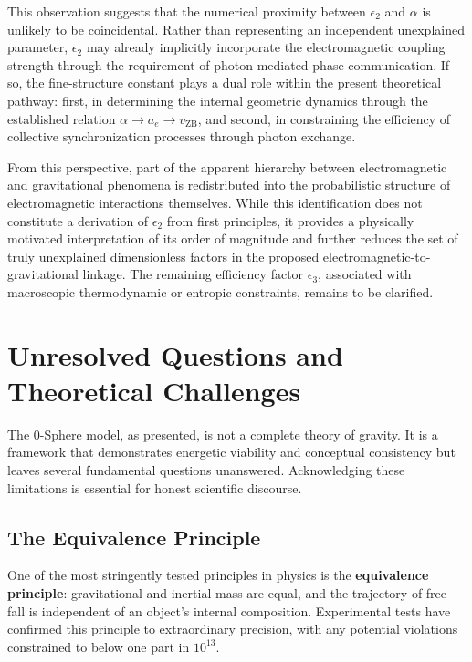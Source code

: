 \documentclass[12pt,letterpaper]{article}
\begin{document}
This observation suggests that the numerical proximity between $\epsilon_2$ and $\alpha$ is unlikely to be coincidental. Rather than representing an independent unexplained parameter, $\epsilon_2$ may already implicitly incorporate the electromagnetic coupling strength through the requirement of photon-mediated phase communication. If so, the fine-structure constant plays a dual role within the present theoretical pathway: first, in determining the internal geometric dynamics through the established relation $\alpha \rightarrow a_e \rightarrow v_{\mathrm{ZB}}$, and second, in constraining the efficiency of collective synchronization processes through photon exchange.

From this perspective, part of the apparent hierarchy between electromagnetic and gravitational phenomena is redistributed into the probabilistic structure of electromagnetic interactions themselves. While this identification does not constitute a derivation of $\epsilon_2$ from first principles, it provides a physically motivated interpretation of its order of magnitude and further reduces the set of truly unexplained dimensionless factors in the proposed electromagnetic-to-gravitational linkage. The remaining efficiency factor $\epsilon_3$, associated with macroscopic thermodynamic or entropic constraints, remains to be clarified.




\section{Unresolved Questions and Theoretical Challenges}
\label{sec:challenges}

\justifying

The 0-Sphere model, as presented, is not a complete theory of gravity. It is a framework that demonstrates energetic viability and conceptual consistency but leaves several fundamental questions unanswered. Acknowledging these limitations is essential for honest scientific discourse.

\subsection{The Equivalence Principle}
\label{subsec:equivalence_principle}

One of the most stringently tested principles in physics is the \textbf{equivalence principle}: gravitational and inertial mass are equal, and the trajectory of free fall is independent of an object's internal composition. Experimental tests have confirmed this principle to extraordinary precision, with any potential violations constrained to below one part in $10^{13}$.
\end{document}
